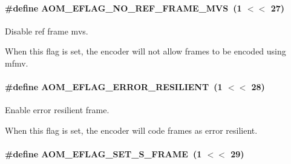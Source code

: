 \paragraph[{\texorpdfstring{A\+O\+M\+\_\+\+E\+F\+L\+A\+G\+\_\+\+N\+O\+\_\+\+R\+E\+F\+\_\+\+F\+R\+A\+M\+E\+\_\+\+M\+VS}{AOM_EFLAG_NO_REF_FRAME_MVS}}]{\setlength{\rightskip}{0pt plus 5cm}\#define A\+O\+M\+\_\+\+E\+F\+L\+A\+G\+\_\+\+N\+O\+\_\+\+R\+E\+F\+\_\+\+F\+R\+A\+M\+E\+\_\+\+M\+VS~(1 $<$$<$ 27)}\hypertarget{group__aom__encoder_ga31943c4d9e34f90a0691949109c224fd}{}\label{group__aom__encoder_ga31943c4d9e34f90a0691949109c224fd}


Disable ref frame mvs. 

When this flag is set, the encoder will not allow frames to be encoded using mfmv. 
\paragraph[{\texorpdfstring{A\+O\+M\+\_\+\+E\+F\+L\+A\+G\+\_\+\+E\+R\+R\+O\+R\+\_\+\+R\+E\+S\+I\+L\+I\+E\+NT}{AOM_EFLAG_ERROR_RESILIENT}}]{\setlength{\rightskip}{0pt plus 5cm}\#define A\+O\+M\+\_\+\+E\+F\+L\+A\+G\+\_\+\+E\+R\+R\+O\+R\+\_\+\+R\+E\+S\+I\+L\+I\+E\+NT~(1 $<$$<$ 28)}\hypertarget{group__aom__encoder_gaf8d13359c477e5787cf67b6e583317a0}{}\label{group__aom__encoder_gaf8d13359c477e5787cf67b6e583317a0}


Enable error resilient frame. 

When this flag is set, the encoder will code frames as error resilient. 
\paragraph[{\texorpdfstring{A\+O\+M\+\_\+\+E\+F\+L\+A\+G\+\_\+\+S\+E\+T\+\_\+\+S\+\_\+\+F\+R\+A\+ME}{AOM_EFLAG_SET_S_FRAME}}]{\setlength{\rightskip}{0pt plus 5cm}\#define A\+O\+M\+\_\+\+E\+F\+L\+A\+G\+\_\+\+S\+E\+T\+\_\+\+S\+\_\+\+F\+R\+A\+ME~(1 $<$$<$ 29)}\hypertarget{group__aom__encoder_ga98480541d93f77481d44dfb0896fcdc5}{}\label{group__aom__encoder_ga98480541d93f77481d44dfb0896fcdc5}


